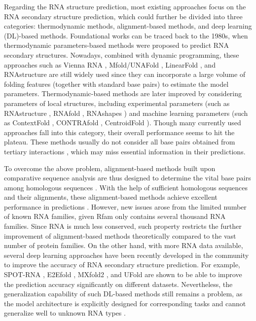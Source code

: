 Regarding the RNA structure prediction, most existing approaches focus on the RNA secondary structure prediction, which could further be divided into three categories: thermodynamic methods, alignment-based methods, and deep learning (DL)-based methods. Foundational works can be traced back to the 1980s, when thermodynamic parameters-based methods were proposed \citep{zuker1984rna, waterman1978rna, rivas2013four} to predict RNA secondary structures. Nowadays, combined with dynamic programming, these approaches such as Vienna RNA \citep{ stadler2011viennarna,hofacker1994fast}, Mfold/UNAFold \citep{markham2008unafold,zuker2003mfold}, LinearFold \citep{huang2019linearfold}, and RNAstructure \citep{mathews1998updated,reuter2010rnastructure} are still widely used since they can incorporate a large volume of folding features (together with standard base pairs) to estimate the model parameters.
Thermodynamic-based methods are later improved by considering parameters of local structures, including experimental parameters (such as RNAstructure \cite{reuter2010rnastructure}, RNAfold \cite{lorenz2011viennarna}, RNAshapes \cite{janssen2015rna}) and machine learning parameters (such as ContextFold \cite{zakov2011rich}, CONTRAfold \cite{do2006contrafold}, CentroidFold \cite{sato2009centroidfold}). 
Though many currently used approaches fall into this category, their overall performance seems to hit the plateau. These methods usually do not consider all base pairs obtained from tertiary interactions \cite{nowakowski1997rna,rivas2013four,sato2009centroidfold}, which may miss essential information in their predictions.
%
%


To overcome the above problem, alignment-based methods built upon comparative sequence analysis are thus designed to determine the vital base pairs among homologous sequences \cite{singh2019rna}.
With the help of sufficient homologous sequences and their alignments, these alignment-based methods achieve excellent performance in predictions \cite{gutell2002accuracy,singh2019rna}. 
However, new issues arose from the limited number of known RNA families, given Rfam only contains several thousand RNA families. Since RNA is much less conserved, such property restricts the further improvement of alignment-based methods theoretically compared to the vast number of protein families.
On the other hand, with more RNA data available, several deep learning approaches have been recently developed in the community to improve the accuracy of RNA secondary structure prediction. For example, SPOT-RNA \cite{singh2019rna}, E2Efold \cite{chen2020rna}, MXfold2 \cite{sato2021rna}, and UFold \cite{fu2021ufold} are shown to be able to improve the prediction accuracy significantly on different datasets.
Nevertheless, the generalization capability of such DL-based methods still remains a problem, as the model architecture is explicitly designed for corresponding tasks and cannot generalize well to unknown RNA types \cite{chen2020rna}.
%
%

